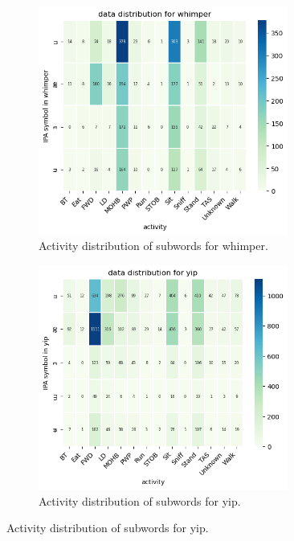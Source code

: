 \documentclass[letterpaper]{article}
\begin{document}
\begin{figure}[h]
\begin{subfigure}[]{0.4\textwidth}
	\centering
	\includegraphics[width=0.9\textwidth]{images/symbol_whimper.png}
	\caption{Activity distribution of subwords for whimper.}
\label{fig:31}
\end{subfigure}
\begin{subfigure}[]{0.4\textwidth}
	\centering
	\includegraphics[width=0.9\textwidth]{images/symbol_yip.png}
	\caption{Activity distribution of subwords for yip.}
\label{fig:41}
\end{subfigure}


\end{figure}
\end{document}
